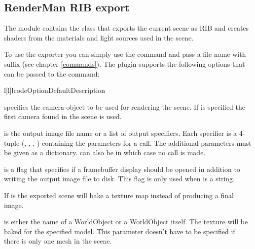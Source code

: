 
\subsection{RenderMan\textsuperscript{\textregistered} RIB export \label{ribexport}}

The module  contains the class 
that exports the current scene as RIB and creates shaders from the materials
and light sources used in the scene.

To use the exporter you can simply use the  command
and pass a file name with suffix  (see chapter \ref{commands}).
The plugin supports the following options that can be passed to
the  command:

\begin{tableiii}{l|l|l}{code}{Option}{Default}{Description}
\end{tableiii}

 specifies the camera object to be used for rendering the scene.
If  is specified the first camera found in the scene is used.

 is the output image file name or a list of output specifiers.
Each specifier is a 4-tuple (, , ,
) containing the parameters for a  call.
The additional parameters must be given as a dictionary.  can
also be  in which case no  call is made.

 is a flag that specifies if a framebuffer
display should be opened in addition to writing the output image file
to disk. This flag is only used when  is a string.

If  is  the exported scene will bake a texture map
instead of producing a final image. 

 is either the name of a WorldObject or a WorldObject itself.
The texture will be baked for the specified model. This parameter doesn't
have to be specified if there is only one mesh in the scene.

